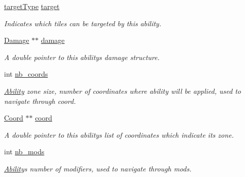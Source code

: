 \begin{DoxyCompactItemize}
\mbox{\label{struct_ability_ad8ce342fec3278694bee817631fd3445}} 
\hyperlink{substruct_8h_a02962753cb153ca273ca219aa4c33ba2}{target\+Type} \hyperlink{struct_ability_ad8ce342fec3278694bee817631fd3445}{target}
\begin{DoxyCompactList}\small\item\em Indicates which tiles can be targeted by this ability. \end{DoxyCompactList}\item 
\mbox{\label{struct_ability_a3ce9e100d75fec1f76f38c443a42342a}} 
\hyperlink{struct_damage}{Damage} $\ast$$\ast$ \hyperlink{struct_ability_a3ce9e100d75fec1f76f38c443a42342a}{damage}
\begin{DoxyCompactList}\small\item\em A double pointer to this ability\textquotesingle{}s damage structure. \end{DoxyCompactList}\item 
\mbox{\label{struct_ability_ab5ce6b0edb6e9297b66b1fd9737a230f}} 
int \hyperlink{struct_ability_ab5ce6b0edb6e9297b66b1fd9737a230f}{nb\+\_\+coords}
\begin{DoxyCompactList}\small\item\em \hyperlink{struct_ability}{Ability} zone size, number of coordinates where ability will be applied, used to navigate through coord. \end{DoxyCompactList}\item 
\mbox{\label{struct_ability_aa26fadc3824d52cec6265751534c2a6d}} 
\hyperlink{struct_coord}{Coord} $\ast$$\ast$ \hyperlink{struct_ability_aa26fadc3824d52cec6265751534c2a6d}{coord}
\begin{DoxyCompactList}\small\item\em A double pointer to this ability\textquotesingle{}s list of coordinates which indicate it\textquotesingle{}s zone. \end{DoxyCompactList}\item 
\mbox{\label{struct_ability_a6a9c77c6fee4bfcfa015c45472ca7964}} 
int \hyperlink{struct_ability_a6a9c77c6fee4bfcfa015c45472ca7964}{nb\+\_\+mods}
\begin{DoxyCompactList}\small\item\em \hyperlink{struct_ability}{Ability}\textquotesingle{}s number of modifiers, used to navigate through mods. \end{DoxyCompactList}\item 

\end{DoxyCompactItemize}
